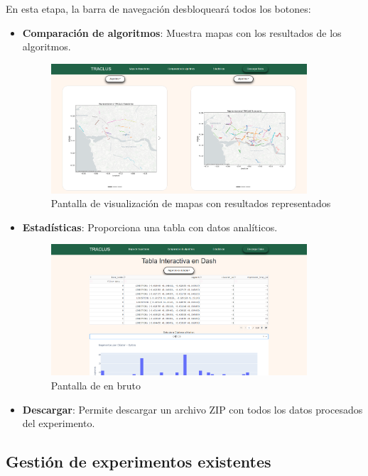 En esta etapa, la barra de navegación desbloqueará todos los botones:

\begin{itemize}
    \item \textbf{Comparación de algoritmos}: Muestra mapas con los resultados de los algoritmos.
    
\begin{figure}[H]
    \centering
    \includegraphics[width=0.9\textwidth]{img/webpage/TRACLUSMap_page.png}
    \caption{Pantalla de visualización de mapas con resultados representados}
\end{figure}
    
    \item \textbf{Estadísticas}: Proporciona una tabla con datos analíticos.
    
\begin{figure}[H]
    \centering
    \includegraphics[width=0.9\textwidth]{img/webpage/estadistic_page.png}
    \caption{Pantalla de en bruto}
\end{figure}

    \item \textbf{Descargar}: Permite descargar un archivo ZIP con todos los datos procesados del experimento.
\end{itemize}

\subsection{Gestión de experimentos existentes}

